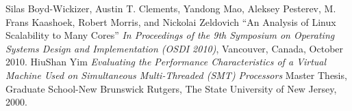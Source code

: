 \begin{thebibliography}{9}
Silas Boyd-Wickizer, Austin T. Clements, Yandong Mao, Aleksey Pesterev,
M. Frans Kaashoek, Robert Morris, and Nickolai Zeldovich
``An Analysis of Linux Scalability to Many Cores''
{\em In Proceedings of the 9th Symposium on Operating Systems Design and Implementation (OSDI 2010)}, Vancouver, Canada, October 2010.
HiuShan Yim
{\em Evaluating the Performance Characteristics of a Virtual Machine Used on Simultaneous Multi-Threaded (SMT) Processors}
Master Thesis, Graduate School-New Brunswick Rutgers, 
The State University of New Jersey, 2000.
\end{thebibliography}

